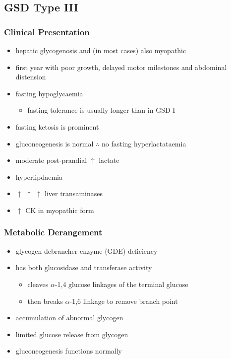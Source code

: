 \documentclass{scrartcl}
\begin{document}
\subsection{GSD Type III}
\label{sec:orge6c4007}
\subsubsection{Clinical Presentation}
\label{sec:org675c3f7}
\begin{itemize}
\item hepatic glycogenosis and (in most cases) also myopathic
\item first year with poor growth, delayed motor milestones and abdominal
distension
\item fasting hypoglycaemia 
\begin{itemize}
\item fasting tolerance is usually longer than in GSD I
\end{itemize}
\item fasting ketosis is prominent
\item gluconeogenesis is normal \(\therefore\) no fasting hyperlactataemia
\item moderate post-prandial \(\uparrow\) lactate
\item hyperlipdaemia
\item \(\uparrow\) \(\uparrow\) \(\uparrow\) liver transaminases
\item \(\uparrow\) CK in myopathic form
\end{itemize}
\subsubsection{Metabolic Derangement}
\label{sec:orgbc2c2b8}
\begin{itemize}
\item glycogen debrancher enzyme (GDE) deficiency
\item has both glucosidase and transferase activity
\begin{itemize}
\item cleaves \(\alpha\)-1,4 glucose linkages of the terminal glucose
\item then breaks \(\alpha\)-1,6 linkage to remove branch point
\end{itemize}
\item accumulation of abnormal glycogen
\item limited glucose release from glycogen
\item gluconeogenesis functions normally
\end{itemize}
\end{document}
